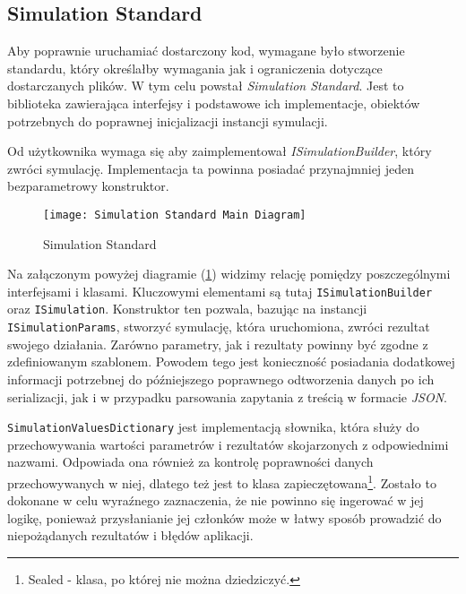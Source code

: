 \subsection{Simulation Standard}
\label{sec:simulationStandard}

\par Aby poprawnie uruchamiać dostarczony kod, wymagane było stworzenie standardu, który określałby wymagania jak i ograniczenia dotyczące dostarczanych plików. W tym celu powstał \emph{Simulation Standard}. Jest to biblioteka zawierająca interfejsy i podstawowe ich implementacje, obiektów potrzebnych do poprawnej inicjalizacji instancji symulacji.

\par Od użytkownika wymaga się aby zaimplementował \emph{ISimulationBuilder}, który zwróci symulację. Implementacja ta powinna posiadać przynajmniej jeden bezparametrowy konstruktor.

\begin{figure}[H]
	\texttt{[image: Simulation Standard Main Diagram]}
	\caption{Simulation Standard}
	\label{fig:simulationStandard}
\end{figure}

\par Na załączonym powyżej diagramie (\ref{fig:simulationStandard}) widzimy relację pomiędzy poszczególnymi interfejsami i klasami. Kluczowymi elementami są tutaj \texttt{ISimulationBuilder} oraz \texttt{ISimulation}. Konstruktor ten pozwala, bazując na instancji \texttt{ISimulationParams}, stworzyć symulację, która uruchomiona, zwróci rezultat swojego działania. Zarówno parametry, jak i rezultaty powinny być zgodne z zdefiniowanym szablonem. Powodem tego jest konieczność posiadania dodatkowej informacji potrzebnej do późniejszego poprawnego odtworzenia danych po ich serializacji, jak i w przypadku parsowania zapytania z treścią w formacie \emph{JSON}.

\par \texttt{SimulationValuesDictionary} jest implementacją słownika, która służy do przechowywania wartości parametrów i rezultatów skojarzonych z odpowiednimi nazwami. Odpowiada ona również za kontrolę poprawności danych przechowywanych w niej, dlatego też jest to klasa zapieczętowana\footnote{Sealed - klasa, po której nie można dziedziczyć.}. Zostało to dokonane w celu wyraźnego zaznaczenia, że nie powinno się ingerować w jej logikę, ponieważ przysłanianie jej członków może w łatwy sposób prowadzić do niepożądanych rezultatów i błędów aplikacji.


